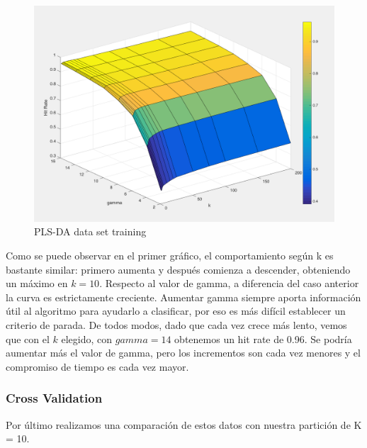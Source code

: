 \begin{figure}[h!]
  \begin{center}
	\includegraphics[scale=0.5]{exp2/PLS-HitRate-1.png}
	\caption{PLS-DA data set training}
  \end{center}
\end{figure}

Como se puede observar en el primer gráfico, el comportamiento según k es bastante similar: primero aumenta y después comienza a descender, obteniendo un máximo en $k = 10$. 
Respecto al valor de gamma, a diferencia del caso anterior la curva es estrictamente creciente. Aumentar gamma siempre aporta información útil al algoritmo para ayudarlo a clasificar, por eso es más difícil establecer un criterio de parada. De todos modos, dado que cada vez crece más lento, vemos que con el $k$ elegido, con $gamma = 14$ obtenemos un hit rate de 0.96. Se podría aumentar más el valor de gamma, pero los incrementos son cada vez menores y el compromiso de tiempo es cada vez mayor.


\subsubsection{Cross Validation}

Por último realizamos una comparación de estos datos con nuestra partición de K = 10.

